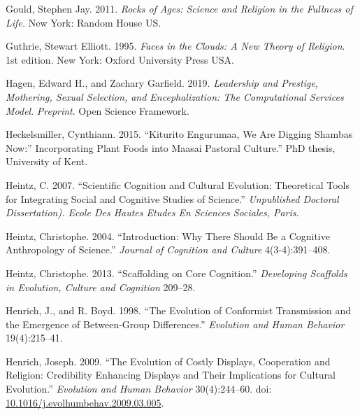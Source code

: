 \documentclass[
  11pt,
]{article}
\begin{document}
\leavevmode\hypertarget{ref-gouldRocksAgesScience2011}{}%
Gould, Stephen Jay. 2011. \emph{Rocks of Ages: Science and Religion in the Fullness of Life.} New York: Random House US.

\leavevmode\hypertarget{ref-guthrieFacesCloudsNew1995}{}%
Guthrie, Stewart Elliott. 1995. \emph{Faces in the Clouds: A New Theory of Religion}. 1st edition. New York: Oxford University Press USA.

\leavevmode\hypertarget{ref-hagenLeadershipPrestigeMothering2019}{}%
Hagen, Edward H., and Zachary Garfield. 2019. \emph{Leadership and Prestige, Mothering, Sexual Selection, and Encephalization: The Computational Services Model}. \emph{Preprint}. Open Science Framework.

\leavevmode\hypertarget{ref-heckelsmillerKituritoEngurumaaWe2015}{}%
Heckelsmiller, Cynthiann. 2015. ``Kiturito Engurumaa, We Are Digging Shambas Now:'' Incorporating Plant Foods into Maasai Pastoral Culture.'' PhD thesis, University of Kent.

\leavevmode\hypertarget{ref-heintzScientificCognitionCultural2007}{}%
Heintz, C. 2007. ``Scientific Cognition and Cultural Evolution: Theoretical Tools for Integrating Social and Cognitive Studies of Science.'' \emph{Unpublished Doctoral Dissertation). Ecole Des Hautes Etudes En Sciences Sociales, Paris}.

\leavevmode\hypertarget{ref-heintzIntroductionWhyThere2004}{}%
Heintz, Christophe. 2004. ``Introduction: Why There Should Be a Cognitive Anthropology of Science.'' \emph{Journal of Cognition and Culture} 4(3-4):391--408.

\leavevmode\hypertarget{ref-heintzScaffoldingCoreCognition2013}{}%
Heintz, Christophe. 2013. ``Scaffolding on Core Cognition.'' \emph{Developing Scaffolds in Evolution, Culture and Cognition} 209--28.

\leavevmode\hypertarget{ref-henrichEvolutionConformistTransmission1998}{}%
Henrich, J., and R. Boyd. 1998. ``The Evolution of Conformist Transmission and the Emergence of Between-Group Differences.'' \emph{Evolution and Human Behavior} 19(4):215--41.

\leavevmode\hypertarget{ref-henrichEvolutionCostlyDisplays2009}{}%
Henrich, Joseph. 2009. ``The Evolution of Costly Displays, Cooperation and Religion: Credibility Enhancing Displays and Their Implications for Cultural Evolution.'' \emph{Evolution and Human Behavior} 30(4):244--60. doi: \href{https://doi.org/10.1016/j.evolhumbehav.2009.03.005}{10.1016/j.evolhumbehav.2009.03.005}.
\end{document}
